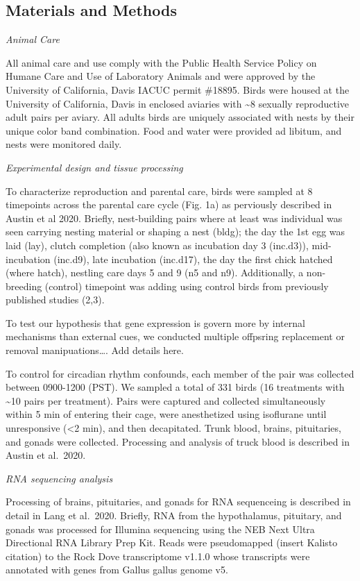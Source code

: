 \hypertarget{materials-and-methods}{%
\subsection{Materials and Methods}\label{materials-and-methods}}

\emph{Animal Care}

All animal care and use comply with the Public Health Service Policy on
Humane Care and Use of Laboratory Animals and were approved by the
University of California, Davis IACUC permit \#18895. Birds were housed
at the University of California, Davis in enclosed aviaries with
\textasciitilde{}8 sexually reproductive adult pairs per aviary. All
adults birds are uniquely associated with nests by their unique color
band combination. Food and water were provided ad libitum, and nests
were monitored daily.

\emph{Experimental design and tissue processing}

To characterize reproduction and parental care, birds were sampled at 8
timepoints across the parental care cycle (Fig. 1a) as perviously
described in Austin et al 2020. Briefly, nest-building pairs where at
least was individual was seen carrying nesting material or shaping a
nest (bldg); the day the 1st egg was laid (lay), clutch completion (also
known as incubation day 3 (inc.d3)), mid-incubation (inc.d9), late
incubation (inc.d17), the day the first chick hatched (where hatch),
nestling care days 5 and 9 (n5 and n9). Additionally, a non-breeding
(control) timepoint was adding using control birds from previously
published studies (2,3).

To test our hypothesis that gene expression is govern more by internal
mechanisms than external cues, we conducted multiple offpsring
replacement or removal manipuations\ldots{}. Add details here.

To control for circadian rhythm confounds, each member of the pair was
collected between 0900-1200 (PST). We sampled a total of 331 birds (16
treatments with \textasciitilde{}10 pairs per treatment). Pairs were
captured and collected simultaneously within 5 min of entering their
cage, were anesthetized using isoflurane until unresponsive
(\textless{}2 min), and then decapitated. Trunk blood, brains,
pituitaries, and gonads were collected. Processing and analysis of truck
blood is described in Austin et al.~2020.

\emph{RNA sequencing analysis}

Processing of brains, pituitaries, and gonads for RNA sequenceing is
described in detail in Lang et al.~2020. Briefly, RNA from the
hypothalamus, pituitary, and gonads was processed for Illumina
sequencing using the NEB Next Ultra Directional RNA Library Prep Kit.
Reads were pseudomapped (insert Kalisto citation) to the Rock Dove
transcriptome v1.1.0 whose transcripts were annotated with genes from
Gallus gallus genome v5.

